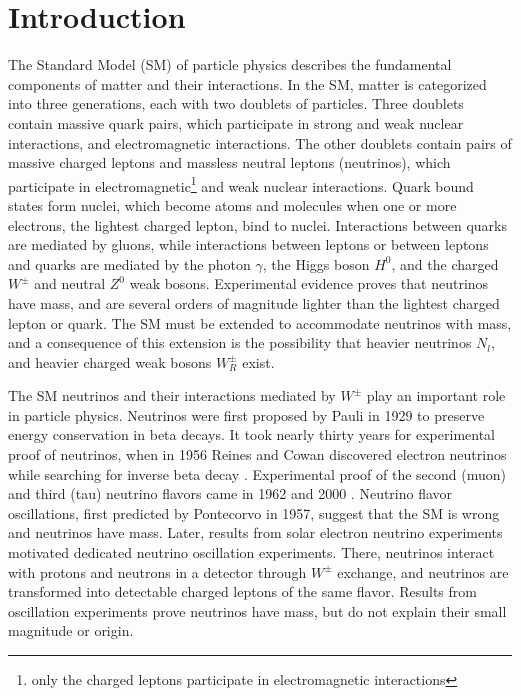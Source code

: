 \chapter{Introduction}
\label{intro_chapter}
The Standard Model (SM) of particle physics describes the fundamental components of matter and their interactions.  
In the SM, matter is categorized into three generations, each with two doublets of particles.  Three doublets 
contain massive quark pairs, which participate in strong and weak nuclear interactions, and electromagnetic interactions.  
The other doublets contain pairs of massive charged leptons and massless neutral leptons (neutrinos), which 
participate in electromagnetic\footnote{only the charged leptons participate in electromagnetic interactions} and weak nuclear interactions.  Quark bound states form nuclei, which become atoms 
and molecules when one or more electrons, the lightest charged lepton, bind to nuclei.  Interactions between quarks 
are mediated by gluons, while interactions between leptons or between leptons and quarks are mediated by the photon $\gamma$, 
the Higgs boson $H^{0}$, and the charged $W^{\pm}$ and neutral $Z^{0}$ weak bosons.  Experimental evidence \cite{NOvAresults,mainzPhaseIIResults,t2kResults} 
proves that neutrinos have mass, and are several orders of magnitude lighter than the lightest charged 
lepton or quark.  The SM must be extended to accommodate neutrinos with mass, and a consequence of this extension is the 
possibility that heavier neutrinos $N_{l}$, and heavier charged weak bosons $W^{\pm}_{R}$ exist.

The SM neutrinos and their interactions mediated by $W^{\pm}$ play an important role in particle 
physics.  Neutrinos were first proposed by Pauli in 1929 to preserve energy conservation in beta decays.  It took 
nearly thirty years for experimental proof of neutrinos, when in 1956 Reines and Cowan discovered electron neutrinos while 
searching for inverse beta decay \cite{firstNuDiscovery}.  Experimental proof of the second (muon) and third (tau) neutrino flavors came in 
1962 \cite{muNuDiscovery} and 2000 \cite{tauNuDiscovery}.  Neutrino flavor oscillations, first predicted by Pontecorvo in 1957, suggest that the SM 
is wrong and neutrinos have mass.  Later, results from solar electron neutrino experiments \cite{kamiokandeTwo,solarNuSummary} motivated 
dedicated neutrino oscillation experiments.  There, neutrinos interact with protons and neutrons in a detector through 
$W^{\pm}$ exchange, and neutrinos are transformed into detectable charged leptons of the same flavor.  Results from 
oscillation experiments prove neutrinos have mass, but do not explain their small magnitude or origin.

